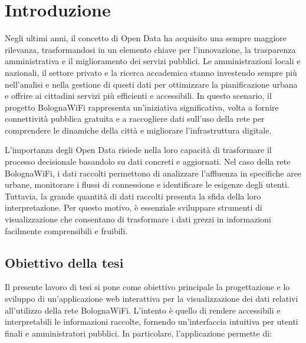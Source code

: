 \chapter*{Introduzione}



Negli ultimi anni, il concetto di Open Data ha acquisito una sempre maggiore rilevanza, trasformandosi in un elemento chiave per l'innovazione, la trasparenza amministrativa e il miglioramento dei servizi pubblici. Le amministrazioni locali e nazionali, il settore privato e la ricerca accademica stanno investendo sempre più nell'analisi e nella gestione di questi dati per ottimizzare la pianificazione urbana e offrire ai cittadini servizi più efficienti e accessibili. In questo scenario, il progetto BolognaWiFi rappresenta un'iniziativa significativa, volta a fornire connettività pubblica gratuita e a raccogliere dati sull'uso della rete per comprendere le dinamiche della città e migliorare l'infrastruttura digitale.

L'importanza degli Open Data risiede nella loro capacità di trasformare il processo decisionale basandolo su dati concreti e aggiornati. Nel caso della rete BolognaWiFi, i dati raccolti permettono di analizzare l'affluenza in specifiche aree urbane, monitorare i flussi di connessione e identificare le esigenze degli utenti. Tuttavia, la grande quantità di dati raccolti presenta la sfida della loro interpretazione. Per questo motivo, è essenziale sviluppare strumenti di visualizzazione che consentano di trasformare i dati grezzi in informazioni facilmente comprensibili e fruibili.

\section*{Obiettivo della tesi}

Il presente lavoro di tesi si pone come obiettivo principale la progettazione e lo sviluppo di un'applicazione web interattiva per la visualizzazione dei dati relativi all'utilizzo della rete BolognaWiFi. L'intento è quello di rendere accessibili e interpretabili le informazioni raccolte, fornendo un'interfaccia intuitiva per utenti finali e amministratori pubblici. In particolare, l'applicazione permette di:

